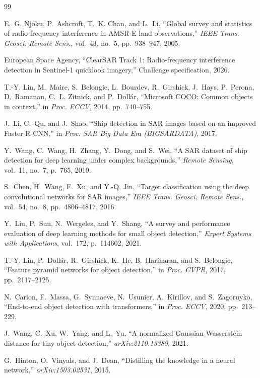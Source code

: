 \documentclass{article}
\begin{document}

\begin{thebibliography}{99}

E.~G. Njoku, P.~Ashcroft, T.~K. Chan, and L.~Li,
``Global survey and statistics of radio-frequency interference in
AMSR-E land observations,''
\emph{IEEE Trans. Geosci. Remote Sens.}, vol.~43, no.~5,
pp.~938--947, 2005.

European Space Agency,
``ClearSAR Track 1: Radio-frequency interference detection in
Sentinel-1 quicklook imagery,''
Challenge specification, 2026.

T.-Y. Lin, M.~Maire, S.~Belongie, L.~Bourdev, R.~Girshick, J.~Hays,
P.~Perona, D.~Ramanan, C.~L. Zitnick, and P.~Doll\'ar,
``Microsoft COCO: Common objects in context,''
in \emph{Proc. ECCV}, 2014, pp.~740--755.

J.~Li, C.~Qu, and J.~Shao,
``Ship detection in SAR images based on an improved Faster R-CNN,''
in \emph{Proc. SAR Big Data Era (BIGSARDATA)}, 2017.

Y.~Wang, C.~Wang, H.~Zhang, Y.~Dong, and S.~Wei,
``A SAR dataset of ship detection for deep learning under complex
backgrounds,''
\emph{Remote Sensing}, vol.~11, no.~7, p.~765, 2019.

S.~Chen, H.~Wang, F.~Xu, and Y.-Q. Jin,
``Target classification using the deep convolutional networks for SAR
images,''
\emph{IEEE Trans. Geosci. Remote Sens.}, vol.~54, no.~8,
pp.~4806--4817, 2016.

Y.~Liu, P.~Sun, N.~Wergeles, and Y.~Shang,
``A survey and performance evaluation of deep learning methods for
small object detection,''
\emph{Expert Systems with Applications}, vol.~172, p.~114602, 2021.

T.-Y. Lin, P.~Doll\'ar, R.~Girshick, K.~He, B.~Hariharan, and
S.~Belongie,
``Feature pyramid networks for object detection,''
in \emph{Proc. CVPR}, 2017, pp.~2117--2125.

N.~Carion, F.~Massa, G.~Synnaeve, N.~Usunier, A.~Kirillov, and
S.~Zagoruyko,
``End-to-end object detection with transformers,''
in \emph{Proc. ECCV}, 2020, pp.~213--229.

J.~Wang, C.~Xu, W.~Yang, and L.~Yu,
``A normalized Gaussian Wasserstein distance for tiny object
detection,''
\emph{arXiv:2110.13389}, 2021.

G.~Hinton, O.~Vinyals, and J.~Dean,
``Distilling the knowledge in a neural network,''
\emph{arXiv:1503.02531}, 2015.


\end{thebibliography}
\end{document}
